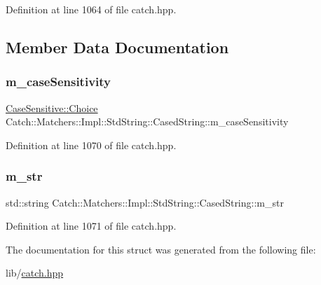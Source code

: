 Definition at line 1064 of file catch.\+hpp.



\subsection{Member Data Documentation}
\hypertarget{struct_catch_1_1_matchers_1_1_impl_1_1_std_string_1_1_cased_string_af399ed93051d8981e298206dee6898b3}{}\label{struct_catch_1_1_matchers_1_1_impl_1_1_std_string_1_1_cased_string_af399ed93051d8981e298206dee6898b3} 
\subsubsection{\texorpdfstring{m\+\_\+case\+Sensitivity}{m\_caseSensitivity}}
{\footnotesize\ttfamily \hyperlink{struct_catch_1_1_case_sensitive_aad49d3aee2d97066642fffa919685c6a}{Case\+Sensitive\+::\+Choice} Catch\+::\+Matchers\+::\+Impl\+::\+Std\+String\+::\+Cased\+String\+::m\+\_\+case\+Sensitivity}



Definition at line 1070 of file catch.\+hpp.

\hypertarget{struct_catch_1_1_matchers_1_1_impl_1_1_std_string_1_1_cased_string_a9f8ce063a934330ac59bf8638f047e99}{}\label{struct_catch_1_1_matchers_1_1_impl_1_1_std_string_1_1_cased_string_a9f8ce063a934330ac59bf8638f047e99} 
\subsubsection{\texorpdfstring{m\+\_\+str}{m\_str}}
{\footnotesize\ttfamily std\+::string Catch\+::\+Matchers\+::\+Impl\+::\+Std\+String\+::\+Cased\+String\+::m\+\_\+str}



Definition at line 1071 of file catch.\+hpp.



The documentation for this struct was generated from the following file\+:\begin{DoxyCompactItemize}
\item 
lib/\hyperlink{catch_8hpp}{catch.\+hpp}\end{DoxyCompactItemize}
